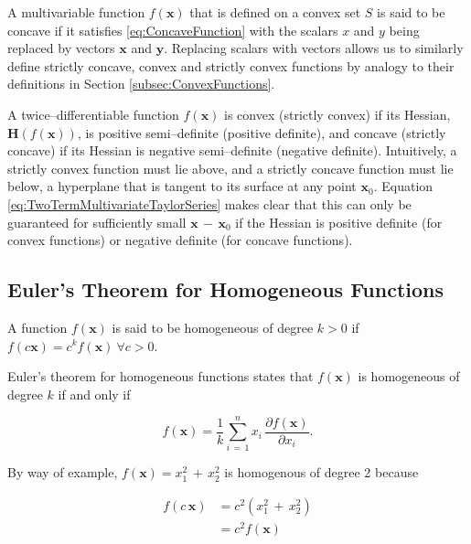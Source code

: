 \documentclass[graybox,envcountchap,sectrefs]{svmono}\usepackage[]{graphicx}\usepackage[]{xcolor}
\begin{document}
\begin{appendices}
A multivariable function $f\left(\mathrm{\mathbf{x}}\right)$ that
is defined on a convex set $S$ is said to be concave if it satisfies
\eqref{eq:ConcaveFunction} with the scalars $x$ and $y$ being replaced
by vectors $\mathrm{\mathbf{x}}$ and $\mathrm{\mathbf{y}}$. Replacing
scalars with vectors allows us to similarly define strictly concave,
convex and strictly convex functions by analogy to their definitions
in Section \eqref{subsec:ConvexFunctions}. 

A twice--differentiable function $f\left(\mathrm{\mathbf{x}}\right)$
is convex (strictly convex) if its Hessian, $\mathrm{\mathbf{H}}\left(f\left(\mathrm{\mathbf{x}}\right)\right)$,
is positive semi--definite (positive definite), and concave (strictly
concave) if its Hessian is negative semi--definite (negative definite).
Intuitively, a strictly convex function must lie above, and a strictly
concave function must lie below, a hyperplane that is tangent to its
surface at any point $\mathrm{\mathbf{x}}_{0}$. Equation \eqref{eq:TwoTermMultivariateTaylorSeries}
makes clear that this can only be guaranteed for sufficiently small
$\mathrm{\mathbf{x}}\,-\,\mathrm{\mathbf{x}}_{0}$ if the Hessian
is positive definite (for convex functions) or negative definite (for
concave functions).

\subsection{Euler's Theorem for Homogeneous Functions}

A function $f\left(\mathrm{\mathbf{x}}\right)$ is said to be homogeneous
of degree $k>0$ if $f\left(c\mathrm{\mathbf{x}}\right)=c^{k}f\left(\mathrm{\mathbf{x}}\right)\ \forall c>0$. 

Euler’s theorem for homogeneous functions states that $f\left(\mathrm{\mathbf{x}}\right)$
is homogeneous of degree $k$ if and only if 

\begin{equation}
f\left(\mathrm{\mathbf{x}}\right)=\frac{1}{k}\sum_{i\,=\,1}^{n}x_{i}\,\frac{\partial f\left(\mathrm{\mathbf{x}}\right)}{\partial x_{i}}.\label{eq:EulersTheorem1}
\end{equation}

By way of example, $f\left(\mathrm{\mathbf{x}}\right)=x_{1}^{2}\,+\,x_{2}^{2}$
is homogenous of degree 2 because

\begin{align}
f\left(c\,\mathrm{\mathbf{x}}\right) & =c^{2}\left(x_{1}^{2}\,+\,x_{2}^{2}\right)\nonumber \\
 & =c^{2}f\left(\mathrm{\mathbf{x}}\right)\label{eq:EulersTheorem2}
\end{align}


\end{appendices}
\end{document}
